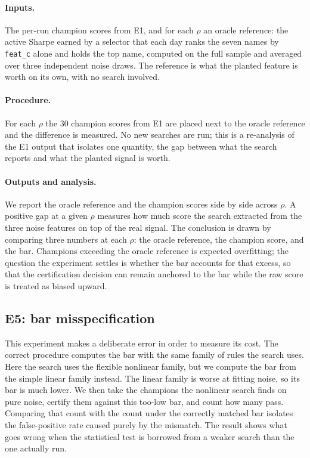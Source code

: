 \documentclass[11pt]{article}
\newcommand{\code}[1]{\texttt{#1}}
\begin{document}
\paragraph{Inputs.} The per-run champion scores from E1, and for each $\rho$ an oracle reference: the
active Sharpe earned by a selector that each day ranks the seven names by \code{feat\_c} alone and holds
the top name, computed on the full sample and averaged over three independent noise draws. The reference
is what the planted feature is worth on its own, with no search involved.

\paragraph{Procedure.} For each $\rho$ the 30 champion scores from E1 are placed next to the oracle
reference and the difference is measured. No new searches are run; this is a re-analysis of the E1 output
that isolates one quantity, the gap between what the search reports and what the planted signal is worth.

\paragraph{Outputs and analysis.} We report the oracle reference and the champion scores side by side
across $\rho$. A positive gap at a given $\rho$ measures how much score the search extracted from the
three noise features on top of the real signal. The conclusion is drawn by comparing three numbers at
each $\rho$: the oracle reference, the champion score, and the bar. Champions exceeding the oracle
reference is expected overfitting; the question the experiment settles is whether the bar accounts for
that excess, so that the certification decision can remain anchored to the bar while the raw score is
treated as biased upward.

\subsection{E5: bar misspecification}

This experiment makes a deliberate error in order to measure its
cost. The correct procedure computes the bar with the same family of rules the search uses. Here the
search uses the flexible nonlinear family, but we compute the bar from the simple linear family instead.
The linear family is worse at fitting noise, so its bar is much lower. We then take the champions the
nonlinear search finds on pure noise, certify them against this too-low bar, and count how many pass.
Comparing that count with the count under the correctly matched bar isolates the false-positive rate
caused purely by the mismatch. The result shows what goes wrong when the statistical test is borrowed
from a weaker search than the one actually run.
\end{document}
